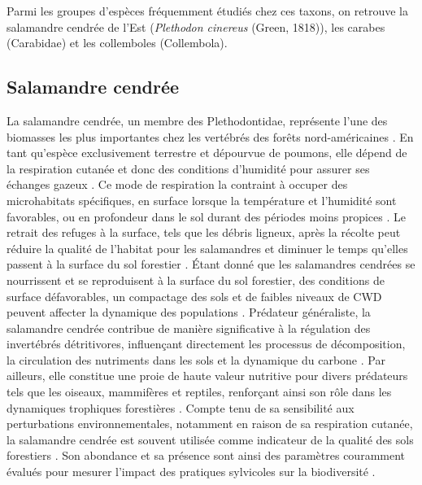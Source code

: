 Parmi les groupes d'espèces fréquemment étudiés chez ces taxons, on retrouve la salamandre cendrée de l'Est (\textit{Plethodon cinereus} (Green, 1818)), les carabes (Carabidae) et les collemboles (Collembola).

\subsection*{Salamandre cendrée}

La salamandre cendrée, un membre des Plethodontidae, représente l'une des biomasses les plus importantes chez les vertébrés des forêts nord-américaines \citep{Burton1975Salamanderpopulations,Petranka1993Effectstimber,semlitschAbundanceBiomassProduction2014a}. 
En tant qu'espèce exclusivement terrestre et dépourvue de poumons, elle dépend de la respiration cutanée et donc des conditions d'humidité pour assurer ses échanges gazeux \citep{Heatwole1961Relationsubstrate}. 
Ce mode de respiration la contraint à occuper des microhabitats spécifiques, en surface lorsque la température et l'humidité sont favorables, ou en profondeur dans le sol durant des périodes moins propices \citep{Grizzell1949HibernationSite,FraserEmpiricalEvaluation1976,Jaeger1980MicrohabitatsTerrestrial}. 
Le retrait des refuges à la surface, tels que les débris ligneux, après la récolte peut réduire la qualité de l'habitat pour les salamandres et diminuer le temps qu'elles passent à la surface du sol forestier \citep{Achat2015Quantifyingconsequences,Peele2017EffectsWoody}. 
Étant donné que les salamandres cendrées se nourrissent et se reproduisent à la surface du sol forestier, des conditions de surface défavorables, un compactage des sols et de faibles niveaux de CWD peuvent affecter la dynamique des populations \citep{Peterman2014Spatialvariation}. 
Prédateur généraliste, la salamandre cendrée contribue de manière significative à la régulation des invertébrés détritivores, influençant directement les processus de décomposition, la circulation des nutriments dans les sols et la dynamique du carbone \citep{Burton1975Energyflow,Wyman1998Experimentalassessment,Walton2013Topdownregulation,Hickerson2017Easternredbacked}. 
Par ailleurs, elle constitue une proie de haute valeur nutritive pour divers prédateurs tels que les oiseaux, mammifères et reptiles, renforçant ainsi son rôle dans les dynamiques trophiques forestières \citep{Burton1975Energyflow,Pough1987abundancesalamanders,Petranka1998SalamandersUnited}. 
Compte tenu de sa sensibilité aux perturbations environnementales, notamment en raison de sa respiration cutanée, la salamandre cendrée est souvent utilisée comme indicateur de la qualité des sols forestiers \citep{Welsh2001caseusing}. 
Son abondance et sa présence sont ainsi des paramètres couramment évalués pour mesurer l'impact des pratiques sylvicoles sur la biodiversité \citep{Harpole1999Effectsseven,Grialou2000effectsforest,Homyack2009Longtermeffects,Hocking2013Effectsexperimental,Mazerolle2021Woodlandsalamander}. 

